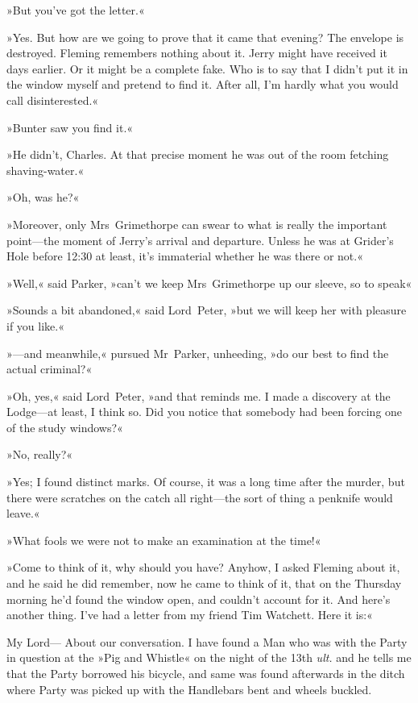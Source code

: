 »But you've got the letter.«

»Yes. But how are we going to prove that it came that evening? The envelope is destroyed. Fleming remembers nothing about it. Jerry might have received it days earlier. Or it might be a complete fake. Who is to say that I didn't put it in the window myself and pretend to find it. After all, I'm hardly what you would call disinterested.«

»Bunter saw you find it.«

»He didn't, Charles. At that precise moment he was out of the room fetching shaving-water.«

»Oh, was he?«

»Moreover, only Mrs~Grimethorpe can swear to what is really the important point—the moment of Jerry's arrival and departure. Unless he was at Grider's Hole before 12:30 at least, it's immaterial whether he was there or not.«

»Well,« said Parker, »can't we keep Mrs~Grimethorpe up our sleeve, so to speak\longdash«

»Sounds a bit abandoned,« said Lord~Peter, »but we will keep her with pleasure if you like.«

»—and meanwhile,« pursued Mr~Parker, unheeding, »do our best to find the actual criminal?«

»Oh, yes,« said Lord~Peter, »and that reminds me. I made a discovery at the Lodge—at least, I think so. Did you notice that somebody had been forcing one of the study windows?«

»No, really?«

»Yes; I found distinct marks. Of course, it was a long time after the murder, but there were scratches on the catch all right—the sort of thing a penknife would leave.«

»What fools we were not to make an examination at the time!«

»Come to think of it, why should you have? Anyhow, I asked Fleming about it, and he said he did remember, now he came to think of it, that on the Thursday morning he'd found the window open, and couldn't account for it. And here's another thing. I've had a letter from my friend Tim Watchett. Here it is:«


\begin{mail}{}{My Lord---}
	About our conversation. I have found a Man who was with the Party in question at the »Pig and Whistle« on the night of the 13th \textit{ult.} and he tells me that the Party borrowed his bicycle, and same was found afterwards in the ditch where Party was picked up with the Handlebars bent and wheels buckled.
\end{mail}

